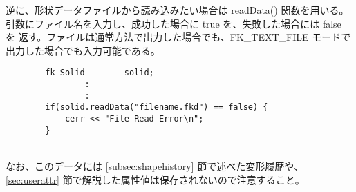 逆に、形状データファイルから読み込みたい場合は readData() 関数を用いる。
引数にファイル名を入力し、成功した場合に true を、失敗した場合には false を
返す。ファイルは通常方法で出力した場合でも、FK\_TEXT\_FILE モードで
出力した場合でも入力可能である。
\\
\begin{breakbox}
\begin{verbatim}
        fk_Solid        solid;
                :
                :
        if(solid.readData("filename.fkd") == false) {
            cerr << "File Read Error\n";
        }
\end{verbatim}
\end{breakbox}
~ \\
なお、このデータには \ref{subsec:shapehistory} 節で述べた変形履歴や、
\ref{sec:userattr} 節で解説した属性値は保存されないので注意すること。
